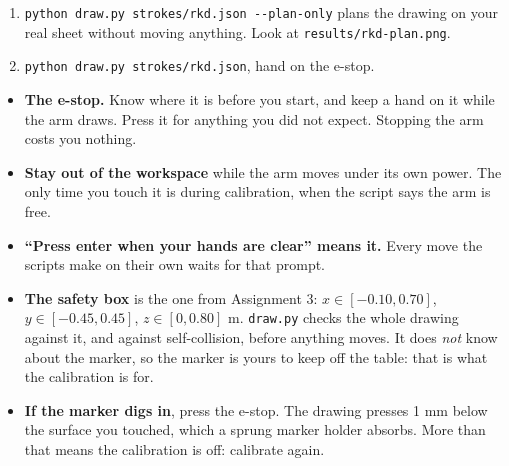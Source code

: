\documentclass{16384_doc}
\begin{document}
\begin{questions}
\begin{enumerate}[label=\alph*.]
\begin{enumerate}[label=(\roman*)]
                  Any order round the sheet works: the corners are put in
                  order for you.  The controller's own safety fence is off
                  while calibrating and back on when it ends; the library's
                  safety box stays on throughout.  The simulator has no free
                  drive, so there \verb!calibrate.py --manual! has you make the
                  touches with the keyboard instead (\verb!w!/\verb!s!,
                  \verb!a!/\verb!d!, \verb!r!/\verb!f!, with \verb!1!, \verb!2!,
                  \verb!3! setting the step to 0.5, 2 or 10~mm).
            \item \verb!python draw.py strokes/rkd.json --plan-only! plans the
                  drawing on your real sheet without moving anything.  Look at
                  \verb!results/rkd-plan.png!.
            \item \verb!python draw.py strokes/rkd.json!, hand on the e-stop.
        \end{enumerate}

        \begin{tcolorbox}[colback=red!5, colframe=red!60!black,
            title={Safety: Read this before you touch the robot}]
        \begin{itemize}
          \item \textbf{The e-stop.} Know where it is before you start, and keep
                a hand on it while the arm draws.  Press it for anything you did
                not expect.  Stopping the arm costs you nothing.
          \item \textbf{Stay out of the workspace} while the arm moves under its
                own power.  The only time you touch it is during calibration, when
                the script says the arm is free.
          \item \textbf{``Press enter when your hands are clear'' means it.}
                Every move the scripts make on their own waits for that prompt.
          \item \textbf{The safety box} is the one from Assignment 3:
                $x \in [-0.10, 0.70]$, $y \in [-0.45, 0.45]$, $z \in [0, 0.80]$ m.
                \verb!draw.py! checks the whole drawing against it, and against
                self-collision, before anything moves.  It does \emph{not} know
                about the marker, so the marker is yours to keep off the table:
                that is what the calibration is for.
          \item \textbf{If the marker digs in}, press the e-stop.  The drawing
                presses 1 mm below the surface you touched, which a sprung marker
                holder absorbs.  More than that means the calibration is off:
                calibrate again.
        \end{itemize}
        \end{tcolorbox}


\end{enumerate}
\end{questions}
\end{document}
